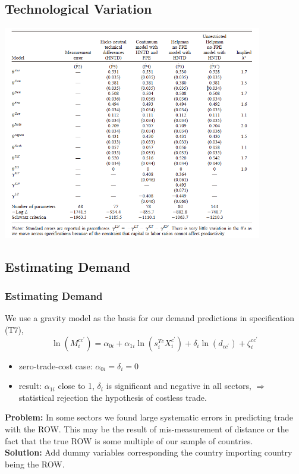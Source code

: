 \documentclass[xcolor=svgnames,10pt]{beamer}
\begin{document}
\subsection{Technological Variation}
\begin{frame}[plain]
\centering
\includegraphics[width=0.85\textwidth]{tech.png}
\end{frame}

\subsection{Estimating Demand}
\begin{frame}[c]\frametitle{Estimating Demand}
We use a gravity model as the basis for our demand predictions in specification (T7),
\begin{equation}
\ln (M_{i}^{cc^{\prime}}) = \alpha_{0i}+\alpha_{1i} \ln(s_{i}^{Tc}X_{i}^{c^{\prime}})+ \delta_{i} \ln(d_{cc^{\prime}})+\zeta_{i}^{cc^{\prime}}
\end{equation}
\begin{itemize}
    \item zero-trade-cost case: $\alpha_{0i}=\delta_{i}=0$
    \item result: $\alpha_{1i}$ close to 1, $\delta_{i}$ is significant and negative in all sectors, $\Rightarrow$ statistical rejection the hypothesis of costless trade.
\end{itemize}

\textbf{Problem:} In some sectors we found large systematic errors in predicting trade with the ROW. This may be the result of mis-measurement of distance or the fact that the true ROW is some multiple of our sample of countries.\\
\textbf{Solution:} Add dummy variables corresponding the country importing country being the ROW.
\end{frame}
\end{document}
